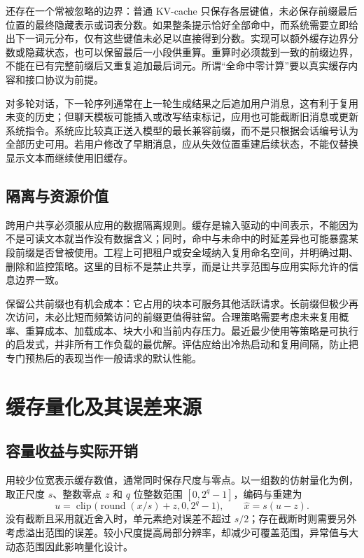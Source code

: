 \documentclass[UTF8,12pt,a4paper,fontset=fandol]{ctexart}
\begin{document}
还存在一个常被忽略的边界：普通 KV-cache 只保存各层键值，未必保存前缀最后位置的最终隐藏表示或词表分数。如果整条提示恰好全部命中，而系统需要立即给出下一词元分布，仅有这些键值未必足以直接得到分数。实现可以额外缓存边界分数或隐藏状态，也可以保留最后一小段供重算。重算时必须裁到一致的前缀边界，不能在已有完整前缀后又重复追加最后词元。所谓“全命中零计算”要以真实缓存内容和接口协议为前提。

对多轮对话，下一轮序列通常在上一轮生成结果之后追加用户消息，这有利于复用未变的历史；但聊天模板可能插入或改写结束标记，应用也可能截断旧消息或更新系统指令。系统应比较真正送入模型的最长兼容前缀，而不是只根据会话编号认为全部历史可用。若用户修改了早期消息，应从失效位置重建后续状态，不能仅替换显示文本而继续使用旧缓存。

\subsection{隔离与资源价值}

跨用户共享必须服从应用的数据隔离规则。缓存是输入驱动的中间表示，不能因为不是可读文本就当作没有数据含义；同时，命中与未命中的时延差异也可能暴露某段前缀是否曾被使用。工程上可把租户或安全域纳入复用命名空间，并明确过期、删除和监控策略。这里的目标不是禁止共享，而是让共享范围与应用实际允许的信息边界一致。

保留公共前缀也有机会成本：它占用的块本可服务其他活跃请求。长前缀但极少再次访问，未必比短而频繁访问的前缀更值得驻留。合理策略需要考虑未来复用概率、重算成本、加载成本、块大小和当前内存压力。最近最少使用等策略是可执行的启发式，并非所有工作负载的最优解。评估应给出冷热启动和复用间隔，防止把专门预热后的表现当作一般请求的默认性能。

\section{缓存量化及其误差来源}
\label{sec:kv-quantization}

\subsection{容量收益与实际开销}

用较少位宽表示缓存数值，通常同时保存尺度与零点。以一组数的仿射量化为例，取正尺度 $s$、整数零点 $z$ 和 $q$ 位整数范围 $[0,2^q-1]$，编码与重建为
\begin{equation}
 u=\operatorname{clip}\bigl(\operatorname{round}(x/s)+z,0,2^q-1\bigr),
 \qquad \widehat x=s(u-z).
 \label{eq:kv-quantization}
\end{equation}
没有截断且采用就近舍入时，单元素绝对误差不超过 $s/2$；存在截断时则需要另外考虑溢出范围的误差。较小尺度提高局部分辨率，却减少可覆盖范围，异常值与大动态范围因此影响量化设计。
\end{document}
